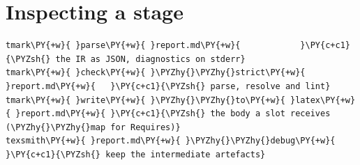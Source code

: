 \documentclass[a4paper,twoside]{article}
\begin{document}
\section{Inspecting a stage}
\begin{tscode}[lang=bash, engine=pygments]
\begin{Verbatim}[commandchars=\\\{\},breaklines, breakanywhere, commandchars=\\\{\}]
tmark\PY{+w}{ }parse\PY{+w}{ }report.md\PY{+w}{            }\PY{c+c1}{\PYZsh{} the IR as JSON, diagnostics on stderr}
tmark\PY{+w}{ }check\PY{+w}{ }\PYZhy{}\PYZhy{}strict\PY{+w}{ }report.md\PY{+w}{   }\PY{c+c1}{\PYZsh{} parse, resolve and lint}
tmark\PY{+w}{ }write\PY{+w}{ }\PYZhy{}\PYZhy{}to\PY{+w}{ }latex\PY{+w}{ }report.md\PY{+w}{ }\PY{c+c1}{\PYZsh{} the body a slot receives (\PYZhy{}\PYZhy{}map for Requires)}
texsmith\PY{+w}{ }report.md\PY{+w}{ }\PYZhy{}\PYZhy{}debug\PY{+w}{       }\PY{c+c1}{\PYZsh{} keep the intermediate artefacts}
\end{Verbatim}
\end{tscode}
\end{document}
